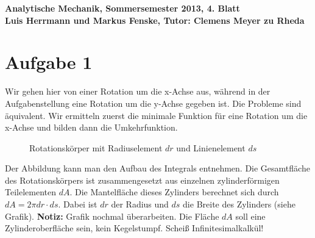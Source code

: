 \documentclass[a4paper,german,12pt,smallheadings]{scrartcl}
\begin{document}
\begin{center}
\bfseries %
\sffamily %
\vspace{-40pt}
Analytische Mechanik, Sommersemester 2013, 4. Blatt \\
Luis Herrmann und Markus Fenske, Tutor: Clemens Meyer zu Rheda
\vspace{-10pt}
\end{center}
\section*{Aufgabe 1}

Wir gehen hier von einer Rotation um die x-Achse aus, während in der
Aufgabenstellung eine Rotation um die y-Achse gegeben ist. Die Probleme sind
äquivalent. Wir ermitteln zuerst die minimale Funktion für eine Rotation um die
x-Achse und bilden dann die Umkehrfunktion.

\begin{figure}[H]
  \begin{center}
  \end{center}
  \caption{Rotationskörper mit Radiuselement $dr$ und Linienelement $ds$}
\end{figure}

Der Abbildung kann man den Aufbau des Integrals entnehmen. Die Gesamtfläche des
Rotationskörpers ist zusammengesetzt aus einzelnen zylinderförmigen
Teilelementen $dA$. Die Mantelfläche dieses Zylinders berechnet sich durch $dA
= 2\pi dr \cdot ds$. Dabei ist $dr$ der Radius und $ds$ die Breite des
Zylinders (siehe Grafik). \textbf{Notiz:} Grafik nochmal überarbeiten. Die
Fläche $dA$ soll eine Zylinderoberfläche sein, kein Kegelstumpf. Scheiß
Infinitesimalkalkül!
\end{document}
